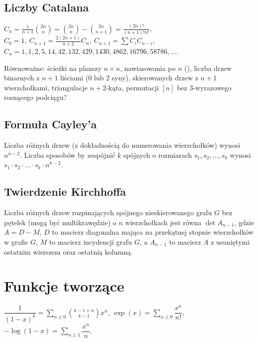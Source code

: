 	\subsection{Liczby Catalana}
		$ C_n=\frac{1}{n+1}\binom{2n}{n}= \binom{2n}{n}-\binom{2n}{n+1} = \frac{(2n)!}{(n+1)!n!} $,
		$ C_0=1,\ C_{n+1} = \frac{2(2n+1)}{n+2}C_n,\ C_{n+1}=\sum C_iC_{n-i} $,
		$C_n = 1, 1, 2, 5, 14, 42, 132, 429, 1430, 4862, 16796, 58786, \dots$.

		Równoważne:
			ścieżki na planszy $n\times n$,
			nawiasowania po $n$ (),
			liczba drzew binarnych z $n+1$ liściami (0 lub 2 syny),
			skierowanych drzew z $n+1$ wierzchołkami,
			triangulacje $n+2$-kąta,
			permutacji $[n]$ bez 3-wyrazowego rosnącego podciągu?

	\subsection{Formuła Cayley'a}
		Liczba różnych drzew (z dokładnością do numerowania wierzchołków) wynosi $n^{n-2}$.
		Liczba sposobów by zespójnić $k$ spójnych o rozmiarach $s_1, s_2, \dots, s_k$ wynosi $s_1 \cdot s_2 \cdot \dots \cdot s_k \cdot n^{k-2}$.

	\subsection{Twierdzenie Kirchhoffa}
		Liczba różnych drzew rozpinających spójnego nieskierowanego grafu $G$ bez pętelek (mogą być multikrawędzie) o $n$ wierzchołkach jest równa $\det A_{n-1}$, gdzie $A = D - M$, $D$ to macierz diagonalna mająca na przekątnej stopnie wierzchołków w grafie $G$, $M$ to macierz incydencji grafu $G$, a $A_{n-1}$ to macierz $A$ z usuniętymi ostatnim wierszem oraz ostatnią kolumną.

		\vspace{2em}

\section{Funkcje tworzące}
		$ \dfrac{1}{\left(1-x\right)^k} = \sum_{n\geq 0} \binom{k - 1 + n}{k - 1} x ^ n $,
		$ \exp(x) = \sum_{n\geq 0} \dfrac{x^n}{n!} $,
		$ -\log(1 - x) = \sum_{n\geq 1} \dfrac{x^n}{n} $.

